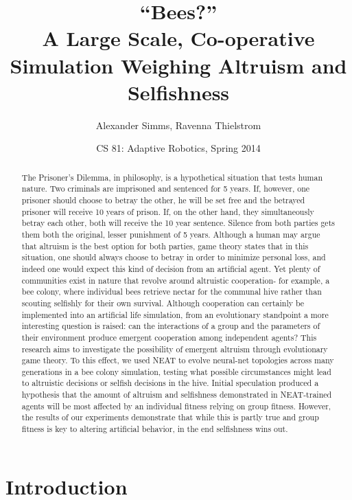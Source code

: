 \documentclass[11pt]{article}
\title  {``Bees?''\\ A Large Scale, Co-operative Simulation 
         Weighing Altruism and Selfishness}
\author {Alexander Simms, Ravenna Thielstrom}
\date   {CS 81: Adaptive Robotics, Spring 2014}
\begin{document}
	\maketitle

	\begin{abstract}
		The Prisoner’s Dilemma, in philosophy, is a hypothetical situation that tests human nature. Two criminals are imprisoned and sentenced for 5 years. If, however, one prisoner should choose to betray the other, he will be set free and the betrayed prisoner will receive 10 years of prison. If, on the other hand, they simultaneously betray each other, both will receive the 10 year sentence. Silence from both parties gets them both the original, lesser punishment of 5 years. Although a human may argue that altruism is the best option for both parties, game theory states that in this situation, one should always choose to betray in order to minimize personal loss, and indeed one would expect this kind of decision from an artificial agent. Yet plenty of communities exist in nature that revolve around altruistic cooperation- for example, a bee colony, where individual bees retrieve nectar for the communal hive rather than scouting selfishly for their own survival. Although cooperation can certainly be implemented into an artificial life simulation, from an evolutionary standpoint a more interesting question is raised: can the interactions of a group and the parameters of their environment produce emergent cooperation among independent agents? This research aims to investigate the possibility of emergent altruism through evolutionary game theory. To this effect, we used NEAT to evolve neural-net topologies across many generations in a bee colony simulation, testing what possible circumstances might lead to altruistic decisions or selfish decisions in the hive. Initial speculation produced a hypothesis that the amount of altruism and selfishness demonstrated in NEAT-trained agents will be most affected by an individual fitness relying on group fitness. However, the results of our experiments demonstrate that while this is partly true and group fitness is key to altering artificial behavior, in the end selfishness wins out.


		\lipsum[1]
	\end{abstract}

	\section{Introduction} %
	\label{sec:introduction}
		\lipsum[3-8]
\end{document}
